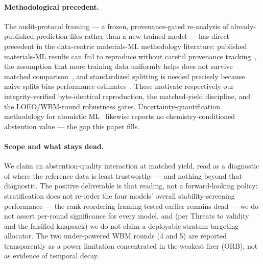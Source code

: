 \documentclass[aip,jcp,preprint,superscriptaddress,amsmath,amssymb]{revtex4-2}
\begin{document}
\paragraph{Methodological precedent.} The audit-protocol framing --- a frozen,
provenance-gated re-analysis of already-published prediction files rather than a new trained
model --- has direct precedent in the data-centric materials-ML methodology literature:
published materials-ML results can fail to reproduce without careful provenance
tracking~\citep{persaud2024reproducibility}, the assumption that more training data uniformly
helps does not survive matched comparison~\citep{ottomano2024aggregation}, and standardized
splitting is needed precisely because naive splits bias performance
estimates~\citep{witman2025matfold}. These motivate respectively our integrity-verified byte-identical
reproduction, the matched-yield discipline, and the LOEO/WBM-round robustness gates.
Uncertainty-quantification methodology for atomistic
ML~\citep{grasselli2025uncertainty,jiang2024autognnuq} likewise reports no
chemistry-conditioned abstention value --- the gap this paper fills.

\paragraph{Scope and what stays dead.} We claim an abstention-quality interaction at
matched yield, read as a diagnostic of where the reference data is least trustworthy --- and
nothing beyond that diagnostic. The positive deliverable is that reading, not a forward-looking
policy: stratification does not re-order the four models' overall
stability-screening performance --- the rank-reordering framing tested earlier remains dead ---
we do not assert per-round significance for every model, and (per Threats to validity and the
falsified knapsack) we do not claim a deployable stratum-targeting allocator. The two under-powered WBM
rounds (4 and 5) are reported transparently as a power limitation concentrated in the weakest
firer (ORB), not as evidence of temporal decay.
\end{document}
